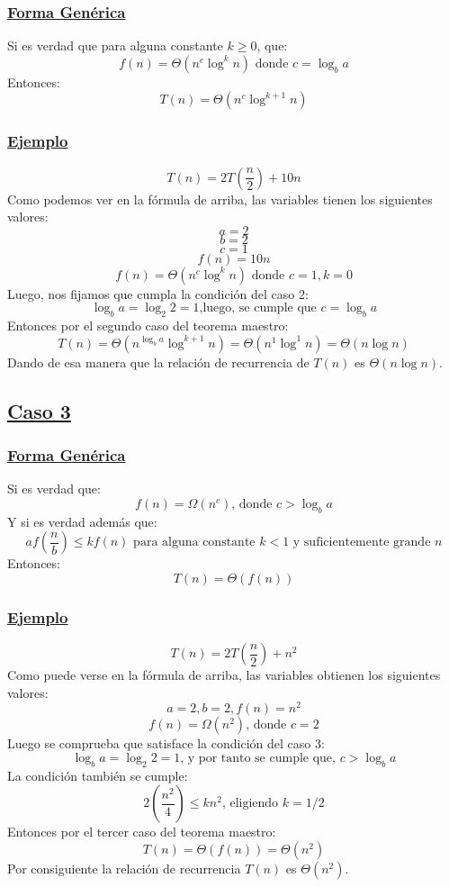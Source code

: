 \documentclass{article}
\begin{document}
			\subsubsection[Forma Genérica]{\hyperlink{toc}{Forma Genérica}}
			\noindent
			Si es verdad que para alguna constante $k\geq0$, que:
			\[f(n)=\Theta(n^{c}\log^{k}n) \textrm{ donde } c=\log_{b}a\]
			Entonces:
			\[T(n)=\Theta(n^{c}\log^{k+1}n)\]
			\subsubsection[Ejemplo]{\hyperlink{toc}{Ejemplo}}
			\[T(n)=2T\left(\frac{n}{2}\right)+10n\]
			Como podemos ver en la fórmula de arriba, las variables tienen los siguientes valores:
			\[a=2\]
			\[b=2\]
			\[c=1\]
			\[f(n)=10n\]
			\[f(n)=\Theta(n^{c}\log^{k}n) \textrm{ donde } c=1,k=0\]
			Luego, nos fijamos que cumpla la condición del caso 2:
			\[\log_{b}a=\log_{2}2=1 \textrm{,luego, se cumple que } c=\log_{b}a\]
			Entonces por el segundo caso del teorema maestro:
			\[T(n)=\Theta(n^{\log_{b}a}\log^{k+1}n)=\Theta(n^{1}\log^{1}n)=\Theta(n\log n)\]
			Dando de esa manera que la relación de recurrencia de $T(n)$ es $\Theta(n\log n)$.
		\subsection[Caso 3]{\hyperlink{toc}{Caso 3}}
			\subsubsection[Forma Genérica]{\hyperlink{toc}{Forma Genérica}}
			\noindent
			Si es verdad que:
			\[f(n)=\Omega(n^{c}) \textrm{, donde } c>\log_{b}a\]
			Y si es verdad además que:
			\[af\left(\frac{n}{b}\right)\leq kf(n) \textrm{ para alguna constante } k<1 \textrm{ y suficientemente grande } n\]
			Entonces:
			\[T(n)=\Theta(f(n))\]
			\subsubsection[Ejemplo]{\hyperlink{toc}{Ejemplo}}
			\[T(n)=2T\left(\frac{n}{2}\right)+n^{2}\]
			Como puede verse en la fórmula de arriba, las variables obtienen los siguientes valores: 
			\[a=2, b=2, f(n)=n^{2}\]
			\[f(n)=\Omega(n^{2}) \textrm{, donde } c=2\]
			Luego se comprueba que satisface la condición del caso 3: 
			\[\log_{b}a=\log_{2}2=1 \textrm{, y por tanto se cumple que, } c>\log_{b}a\]
			La condición también se cumple: 
			\[2\left(\frac{n^{2}}{4}\right)\leq kn^{2} \textrm{, eligiendo } k=1/2 \]
			Entonces por el tercer caso del teorema maestro: 
			\[T(n)=\Theta(f(n))=\Theta(n^{2})\]
			Por consiguiente la relación de recurrencia $T(n)$ es $\Theta(n^{2})$.
\end{document}
